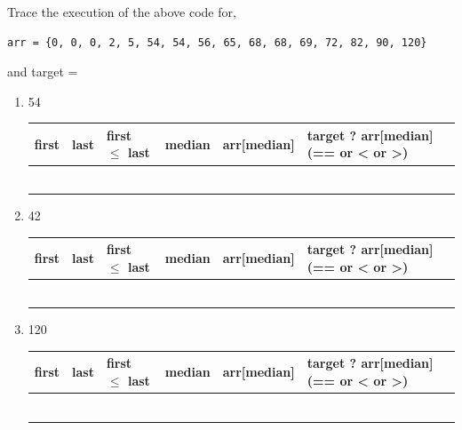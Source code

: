 \begin{exercise2}
Trace the execution of the above code for,

\begin{verbatim}
arr = {0, 0, 0, 2, 5, 54, 54, 56, 65, 68, 68, 69, 72, 82, 90, 120}	
\end{verbatim}

and target = 

\begin{enumerate}

	\item 54

\begin{tabular}{p{1cm}|p{1cm}|p{2cm}|p{1.5cm}|p{2.5cm}| p{4cm}}
  first & last & first $\leq$ last & median & arr[median] & target ? arr[median] (== or < or >)\\
  \hline
  & & & & &\\
  \hline
  & & & & &\\
  \hline
  & & & & &\\
  \hline
  & & & & &\\
  \hline
  & & & & &\\
  \hline
  & & & & &\\
  \hline
\end{tabular}

\item 42

\begin{tabular}{p{1cm}|p{1cm}|p{2cm}|p{1.5cm}|p{2.5cm}| p{4cm}}
  first & last & first $\leq$ last & median & arr[median] & target ? arr[median] (== or < or >)\\
  \hline
  & & & & &\\
  \hline
  & & & & &\\
  \hline
  & & & & &\\
  \hline
  & & & & &\\
  \hline
  & & & & &\\
  \hline
  & & & & &\\
  \hline
\end{tabular}
	
\item 120

\begin{tabular}{p{1cm}|p{1cm}|p{2cm}|p{1.5cm}|p{2.5cm}| p{4cm}}
  first & last & first $\leq$ last & median & arr[median] & target ? arr[median] (== or < or >)\\
  \hline
  & & & & &\\
  \hline
  & & & & &\\
  \hline
  & & & & &\\
  \hline
  & & & & &\\
  \hline
  & & & & &\\
  \hline
  & & & & &\\
  \hline
\end{tabular}
\end{enumerate}
\end{exercise2}
